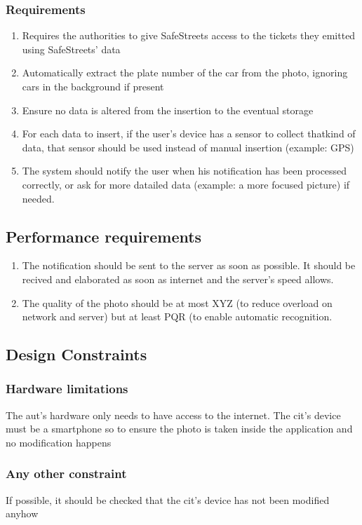 \documentclass{article}
\newcommand{\enum}[1]{\texttt{#1.\arabic*}}
\begin{document}
		\subsubsection{Requirements}
			\begin{enumerate}[label=\enum{R}]
				\item \label{G_storeTickets}Requires the authorities to give SafeStreets access to the tickets they emitted using SafeStreets' data
				\item Automatically extract the plate number of the car from the photo, ignoring cars in the background if present
				\item Ensure no data is altered from the insertion to the eventual storage
				\item For each data to insert, if the  user's device has a sensor to collect thatkind of data, that sensor should be used instead of manual insertion (example: GPS)
				\item The system should notify the user when his notification has been processed correctly, or ask for more datailed data (example: a more focused picture) if needed.
			\end{enumerate}
	\subsection{Performance requirements}
		\begin{enumerate}
			\item The notification should be sent to the server as soon as possible. It should be recived and elaborated as soon as internet and the server's speed allows.
			\item The quality of the photo should be at most XYZ (to reduce overload on network and server) but at least PQR (to enable automatic recognition.
		\end{enumerate}
	\subsection{Design Constraints}
		\subsubsection{Hardware limitations} The aut's hardware only needs to have access to the internet. The cit's device must be a smartphone so to ensure the photo is taken inside the application and no modification happens
		\subsubsection{Any other constraint} If possible, it should be checked that the cit's device has not been modified anyhow
\end{document}
